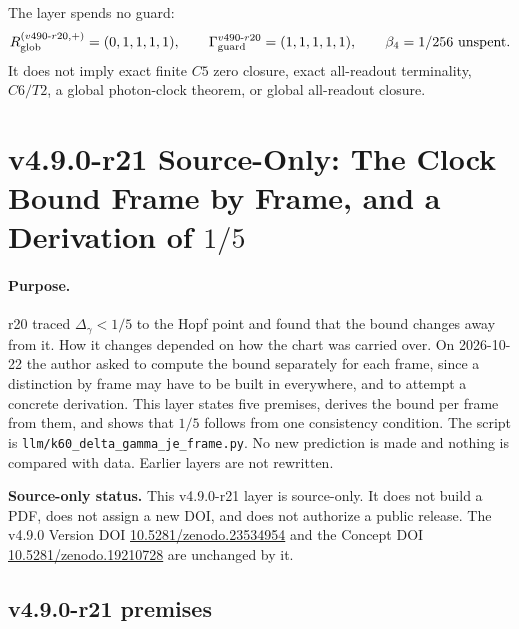 The layer spends no guard:
\[
R_{\rm glob}^{(v490\text{-}r20,+)}=(0,1,1,1,1),
\qquad
\Gamma_{\rm guard}^{v490\text{-}r20}=(1,1,1,1,1),
\qquad
\beta_4=1/256\ \text{unspent}.
\]
It does not imply exact finite \(C5\) zero closure, exact all-readout terminality,
\(C6/T2\), a global photon-clock theorem, or global all-readout closure.

\clearpage
\section*{v4.9.0-r21 Source-Only: The Clock Bound Frame by Frame, and a Derivation of \texorpdfstring{\(1/5\)}{1/5}}
\label{sec:v490-r21-clock-bound-per-frame}

\paragraph{Purpose.}
r20 traced \(\Delta_\gamma<1/5\) to the Hopf point and found that the bound changes away from it.  How it changes depended on
how the chart was carried over.  On 2026-10-22 the author asked to compute the bound separately for each frame, since a
distinction by frame may have to be built in everywhere, and to attempt a concrete derivation.  This layer states five
premises, derives the bound per frame from them, and shows that \(1/5\) follows from one consistency condition.  The script is
\texttt{llm/k60\_delta\_gamma\_je\_frame.py}.  No new prediction is made and nothing is compared with data.  Earlier layers are
not rewritten.

\noindent\textbf{Source-only status.}
This v4.9.0-r21 layer is source-only.  It does not build a PDF, does not assign a new DOI,
and does not authorize a public release.  The v4.9.0 Version DOI
\href{https://doi.org/10.5281/zenodo.23534954}{10.5281/zenodo.23534954} and the Concept DOI
\href{https://doi.org/10.5281/zenodo.19210728}{10.5281/zenodo.19210728} are unchanged by it.

\subsection*{v4.9.0-r21 premises}
\label{subsec:v490-r21-premises}

